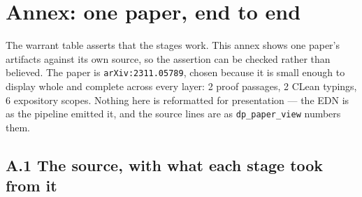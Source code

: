 \appendix
\section{Annex: one paper, end to end}
\label{sec:annex}

The warrant table asserts that the stages work. This annex shows one paper's
artifacts against its own source, so the assertion can be checked rather than
believed. The paper is \texttt{arXiv:2311.05789}, chosen because it is small
enough to display whole and complete across every layer: 2 proof passages, 2
CLean typings, 6 expository scopes. Nothing here is reformatted for
presentation --- the EDN is as the pipeline emitted it, and the source lines
are as \texttt{dp\_paper\_view} numbers them.

\subsection*{A.1 The source, with what each stage took from it}

